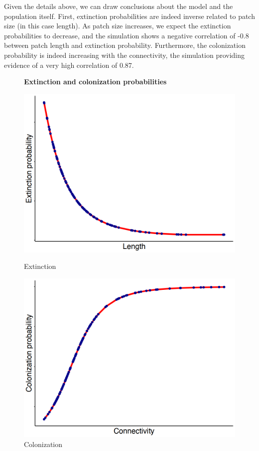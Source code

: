 \documentclass[12pt,a4paper]{article}
\begin{document}
Given the details above, we can draw conclusions about the model and the population itself. First, extinction probabilities are indeed inverse related to patch size (in this case length). As patch size increases, we expect the extinction probabilities to decrease, and the simulation shows a negative correlation of -0.8 between patch length and extinction probability. Furthermore, the colonization probability is indeed increasing with the connectivity, the simulation providing evidence of a very high correlation of 0.87. 

\begin{figure} [H]
    \centering
    \textbf{Extinction and colonization probabilities}\par\medskip
    \begin{minipage}{.5\textwidth}
      \centering
      \includegraphics[width=0.8\linewidth]{extinction_by_length.png}
      \caption{Extinction}
      \label{fig:Extinction by patch length}
    \end{minipage}%
    \begin{minipage}{.5\textwidth}
      \centering
      \includegraphics[width=0.8\linewidth]{colonization_by_connectivity.png}
      \caption{Colonization}
      \label{fig:Colonization by connectivity}
    \end{minipage}
\end{figure}
\end{document}
